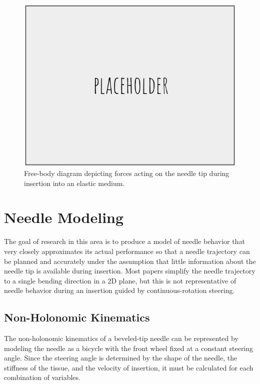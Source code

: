 \begin{figure}[h]
\includegraphics[width=1.0\textwidth]{Fig/placeholder.png}
\caption{Free-body diagram depicting forces acting on the needle tip during insertion into an elastic medium\cite{misra_mechanics_2010}.}
\label{fig:tip_forces}
\end{figure}

\section{Needle Modeling}
The goal of research in this area is to produce a model of needle behavior that very closely approximates its actual performance so that a needle trajectory can be planned and accurately under the assumption that little information about the needle tip is available during insertion. Most papers simplify the needle trajectory to a single bending direction in a 2D plane, but this is not representative of needle behavior during an insertion guided by continuous-rotation steering.

\subsection{Non-Holonomic Kinematics}
The non-holonomic kinematics of a beveled-tip needle can be represented by modeling the needle as a bicycle with the front wheel fixed at a constant steering angle\cite{webster_nonholonomic_2006,cowan_robotic_2011}. Since the steering angle is determined by the shape of the needle, the stiffness of the tissue, and the velocity of insertion, it must be calculated for each combination of variables.

